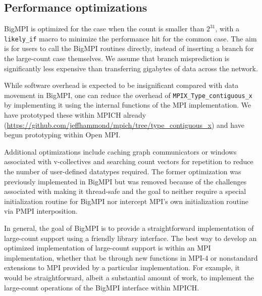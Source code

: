 \subsection{Performance optimizations}

BigMPI is optimized for the case when the count is smaller than $2^{31}$,
with a \texttt{likely\_if} macro to minimize the performance hit for
the common case.  The aim is for users to call the BigMPI routines
directly, instead of inserting a branch for the large-count case themselves.
We assume that branch misprediction is significantly less expensive than
transferring gigabytes of data across the network.

While software overhead is expected to be insignificant compared with data movement
in BigMPI, one can reduce the overhead of \texttt{MPIX\_Type\_contiguous\_x}
by implementing it using the internal functions of the MPI implementation.
We have prototyped these within MPICH already 
(\href{https://github.com/jeffhammond/mpich/tree/type_contiguous_x}
{https://github.com/jeffhammond/mpich/tree/type\_contiguous\_x})
and have begun prototyping within Open MPI.

Additional optimizations include caching graph communicators or windows associated
with v-collectives and searching count vectors for repetition to reduce the number of 
user-defined datatypes required.
The former optimization was previously implemented
in BigMPI but was removed because of the challenges associated with making it 
thread-safe and the goal to neither require a special initialization routine for BigMPI
nor intercept MPI's own initialization routine via PMPI interposition.

In general, the goal of BigMPI is to provide a straightforward implementation of
large-count support using a friendly library interface.
The best way to develop an optimized implementation of large-count support
is within an MPI implementation, whether that be through new functions in MPI-4
or nonstandard extensions to MPI provided by a particular implementation.
For example, it would be straightforward, albeit a substantial amount of work,
to implement the large-count operations of the BigMPI interface within MPICH.



